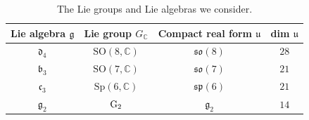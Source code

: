 \documentclass[10pt,a4paper]{amsart}
\numberwithin{equation}{section}
\newcommand{\SO}{{\mathrm{SO}}}
\newcommand{\Sp}{{\mathrm{Sp}}}
\newcommand{\GG}{{\rm G}_2}
\begin{document}
 \begin{table}[h!]\centering\renewcommand{\arraystretch}{1.3}
\begin{tabular}{*{4}{c}}
Lie algebra $\mathfrak{g}$ & Lie group $G_\mathbb{C}$ & Compact real form $\mathfrak{u}$ & dim $\mathfrak{u}$ \\
\hline
$\mathfrak{d}_{4}$ & $\SO(8,\mathbb{C})$	&$\mathfrak{so}(8)$ & $28$ \\
$\mathfrak{b}_{3}$ & $\SO(7,\mathbb{C})$	&$\mathfrak{so}(7)$ & $21$ \\
$\mathfrak{c}_{3}$ & $\Sp(6,\mathbb{C})$	&$\mathfrak{sp}(6)$ & $21$ \\
$\mathfrak{g}_{2}$ & $\GG$	&$\mathfrak{g}_2$ & $14$ \\
 \end{tabular}
\caption{The Lie groups and Lie algebras we consider.}\label{table1}%
\end{table}
\end{document}
